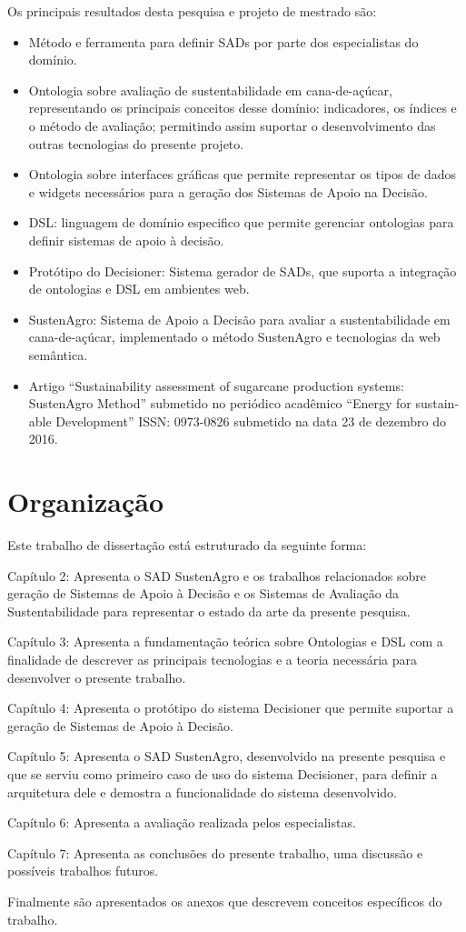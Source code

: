 Os principais resultados desta pesquisa e projeto de mestrado são:
\begin{itemize}
\item Método e ferramenta para definir SADs por parte dos especialistas
do domínio.
\item Ontologia sobre avaliação de sustentabilidade em cana-de-açúcar, representando
os principais conceitos desse domínio: indicadores, os índices e o
método de avaliação; permitindo assim suportar o desenvolvimento das
outras tecnologias do presente projeto.
\item Ontologia sobre interfaces gráficas que permite representar os tipos
de dados e \foreignlanguage{english}{widgets} necessários para a geração
dos Sistemas de Apoio na Decisão.
\item DSL: linguagem de domínio especifico que permite gerenciar ontologias
para definir sistemas de apoio à decisão.
\item Protótipo do Decisioner: Sistema gerador de SADs, que suporta a integração
de ontologias e DSL em ambientes web.
\item SustenAgro: Sistema de Apoio a Decisão para avaliar a sustentabilidade
em cana-de-açúcar, implementado o método SustenAgro e tecnologias
da web semântica.
\item Artigo ``\foreignlanguage{english}{Sustainability assessment of sugarcane
production systems: SustenAgro Method}'' submetido no periódico acadêmico
``\foreignlanguage{english}{Energy for sustainable Development}''
ISSN: 0973-0826 submetido na data 23 de dezembro do 2016. 
\end{itemize}

\section{Organização}

Este trabalho de dissertação está estruturado da seguinte forma: 

Capítulo 2: Apresenta o SAD SustenAgro e os trabalhos relacionados
sobre geração de Sistemas de Apoio à Decisão e os Sistemas de Avaliação
da Sustentabilidade para representar o estado da arte da presente
pesquisa.

Capítulo 3: Apresenta a fundamentação teórica sobre Ontologias e DSL
com a finalidade de descrever as principais tecnologias e a teoria
necessária para desenvolver o presente trabalho.

Capítulo 4: Apresenta o protótipo do sistema Decisioner que permite
suportar a geração de Sistemas de Apoio à Decisão. 

Capítulo 5: Apresenta o SAD SustenAgro, desenvolvido na presente pesquisa
e que se serviu como primeiro caso de uso do sistema Decisioner, para
definir a arquitetura dele e demostra a funcionalidade do sistema
desenvolvido.

Capítulo 6: Apresenta a avaliação realizada pelos especialistas.

Capítulo 7: Apresenta as conclusões do presente trabalho, uma discussão
e possíveis trabalhos futuros.

Finalmente são apresentados os anexos que descrevem conceitos específicos
do trabalho.
